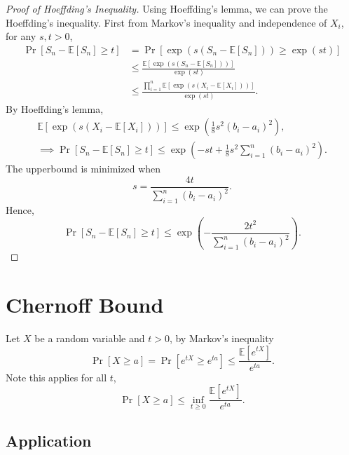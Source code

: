 \begin{proof}[Proof of Hoeffding's Inequality]
Using Hoeffding's lemma, we can prove the Hoeffding's inequality. First from Markov's inequality and independence of $X_i$, for any $s,t > 0$,
\[
	\begin{aligned}
	\Pr[S_n - \mathbb{E}[S_n] \geq t] 
	&= \Pr[\exp(s(S_n - \mathbb{E}[S_n])) \geq \exp(st)] \\
	&\leq \frac{\mathbb{E}[\exp(s(S_n - \mathbb{E}[S_n]))]}{\exp(st)} \\
	&\leq \frac{\prod_{i=1}^n \mathbb{E} [ \exp(s(X_i - \mathbb{E}[X_i])) ]}{\exp(st)}.
	\end{aligned}
\]
By Hoeffding's lemma,
\begin{gather*}
	\mathbb{E} [ \exp(s(X_i - \mathbb{E}[X_i])) ] \leq \exp\left( \frac{1}{8}s^2(b_i-a_i)^2 \right), \\
	\implies \Pr[S_n - \mathbb{E}[S_n] \geq t] \leq \exp \left( -st + \frac{1}{8}s^2\sum_{i=1}^n(b_i - a_i)^2 \right).
\end{gather*}
The upperbound is minimized when
\[
	s = \frac{4t}{\sum_{i=1}^n (b_i - a_i)^2}.
\]
Hence,
\[
	\Pr[S_n - \mathbb{E}[S_n] \geq t] \leq \exp \left( -\frac{2t^2}{\sum_{i=1}^n (b_i - a_i)^2} \right).
\]
\end{proof}

\section{Chernoff Bound}
\label{sec:chernoff}

Let $X$ be a random variable and $t>0$, by Markov's inequality
\[
	\Pr[X \geq a] = \Pr[e^{tX} \geq e^{ta}] \leq \frac{\mathbb{E}[e^{tX}]}{e^{ta}}.
\]
Note this applies for all $t$,
\[
	\Pr[X \geq a] \leq \inf_{t \geq 0} \frac{\mathbb{E}[e^{tX}]}{e^{ta}}.
\]

\subsection{Application}


